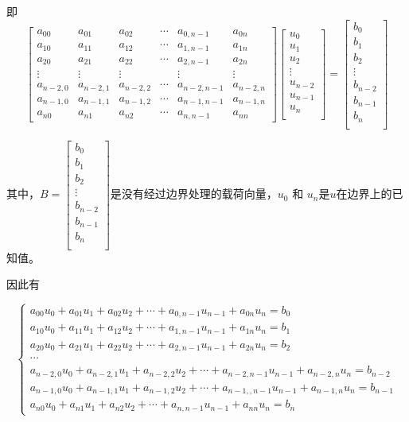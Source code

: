 \documentclass[12pt,a4paper]{article}
\begin{document}
即$$
\begin{bmatrix}
a_{00} & a_{01} & a_{02} & \cdots & a_{0,n-1} & a_{0n} \\
a_{10} & a_{11} & a_{12} & \cdots & a_{1,n-1} & a_{1n} \\
a_{20} & a_{21} & a_{22} & \cdots & a_{2,n-1} & a_{2n} \\
\vdots & \vdots & \vdots &  & \vdots  & \vdots \\
a_{n-2,0} & a_{n-2,1} & a_{n-2,2} & \cdots & a_{n-2,n-1} & a_{n-2,n} \\
a_{n-1,0} & a_{n-1,1} & a_{n-1,2} & \cdots & a_{n-1,n-1} & a_{n-1,n} \\
a_{n0} & a_{n1} & a_{n2} & \cdots & a_{n,n-1} & a_{nn} 
\end{bmatrix}
\begin{bmatrix}
u_{0} \\
u_{1} \\
u_{2} \\
\vdots \\
u_{n-2} \\
u_{n-1} \\
u_{n} \\
\end{bmatrix}=
\begin{bmatrix}
b_{0} \\
b_{1} \\
b_{2} \\
\vdots \\
b_{n-2} \\
b_{n-1} \\
b_{n} \\
\end{bmatrix}$$

其中，$B=\begin{bmatrix}
b_{0} \\
b_{1} \\
b_{2} \\
\vdots \\
b_{n-2} \\
b_{n-1} \\
b_{n} \\
\end{bmatrix}$是没有经过边界处理的载荷向量，$u_0$ 和 $u_n$是$u$在边界上的已知值。

因此有

$$
\begin{cases}
a_{00}u_0 + a_{01}u_1 + a_{02}u_2 +\cdots + a_{0,n-1}u_{n-1} + a_{0n}u_n=b_0 \\
a_{10}u_0 + a_{11}u_1 + a_{12}u_2 +\cdots + a_{1,n-1}u_{n-1} + a_{1n}u_n=b_1 \\
a_{20}u_0 + a_{21}u_1 + a_{22}u_2 +\cdots + a_{2,n-1}u_{n-1} + a_{2n}u_n=b_2 \\
\cdots \\
a_{n-2,0}u_0 + a_{n-2,1}u_1 + a_{n-2,2}u_2 +\cdots + a_{n-2,n-1}u_{n-1} + a_{n-2,n}u_n=b_{n-2} \\
a_{n-1,0}u_0 + a_{n-1,1}u_1 + a_{n-1,2}u_2 +\cdots + a_{n-1,,n-1}u_{n-1} + a_{n-1,n}u_n=b_{n-1} \\
a_{n0}u_0 + a_{n1}u_1 + a_{n2}u_2 +\cdots + a_{n,n-1}u_{n-1} + a_{nn}u_n=b_n
\end{cases}
$$
\end{document}

